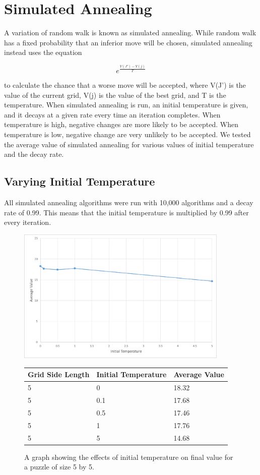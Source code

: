 \documentclass[12pt]{article}
\begin{document}
\section*{Simulated Annealing}

A variation of random walk is known as simulated annealing. While random walk has a fixed probability that an inferior move will be chosen, simulated annealing instead uses the equation

\begin{equation}
e^{\frac{V(J') - V(j)}{T}}
\end{equation}

to calculate the chance that a worse move will be accepted, where V(J') is the value of the current grid, V(j) is the value of the best grid, and T is the temperature. When simulated annealing is run, an initial temperature is given, and it decays at a given rate every time an iteration completes. When temperature is high, negative changes are more likely to be accepted. When temperature is low, negative change are very unlikely to be accepted. We tested the average value of simulated annealing for various values of initial temperature and the decay rate.

\subsection*{Varying Initial Temperature}

All simulated annealing algorithms were run with 10,000 algorithms and a decay rate of 0.99. This means that the initial temperature is multiplied by 0.99 after every iteration.

\begin{figure}[H]
    \centering
    \includegraphics[width=0.9\textwidth]{simulated_annealing_5x5_temperature_excel}
\begin{tabular}{ |p{4cm}||p{4cm}|p{4cm}|  }
 \hline
Grid Side Length& Initial Temperature &Average Value\\
 \hline
5&0&18.32\\
5&0.1&17.68\\
5&0.5&17.46\\
5&1&17.76\\
5&5&14.68\\
 \hline
\end{tabular}
    \caption{A graph showing the effects of initial temperature on final value for a puzzle of size 5 by 5.}
    \label{fig:simulated_annealing_5x5_temperature}
\end{figure}
\end{document}
